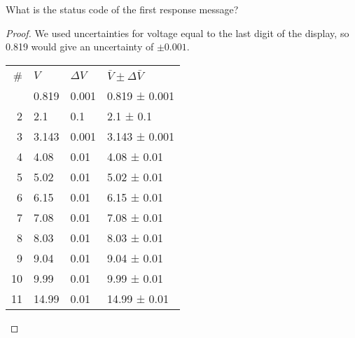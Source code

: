 \documentclass[../../main.tex]{subfiles}
\begin{document}
\begin{wts}
What is the status code of the first response message?
\end{wts}
\begin{proof}

We used uncertainties for voltage equal to the last digit of the display, so 0.819 would give an uncertainty of $\pm 0.001$.
\begin{tabularx}{\textwidth}{@{}r*{3}{l}@{}}
\cmidrule[0.75pt](r){1-4}\addlinespace[0.2em]
\# & $V$ & $\Delta V$ & $\bar V\pm\Delta \bar V$ \tabularnewline \cmidrule[0.5pt](r){1-4}\addlinespace[0.2em] 
1 & 0.819 & 0.001 & 0.819 ± 0.001 \tabularnewline  
2 & 2.1 & 0.1 & 2.1 ± 0.1 \tabularnewline  
3 & 3.143 & 0.001 & 3.143 ± 0.001 \tabularnewline  
4 & 4.08 & 0.01 & 4.08 ± 0.01 \tabularnewline  
5 & 5.02 & 0.01 & 5.02 ± 0.01 \tabularnewline  
6 & 6.15 & 0.01 & 6.15 ± 0.01 \tabularnewline  
7 & 7.08 & 0.01 & 7.08 ± 0.01 \tabularnewline  
8 & 8.03 & 0.01 & 8.03 ± 0.01 \tabularnewline  
9 & 9.04 & 0.01 & 9.04 ± 0.01 \tabularnewline  
10 & 9.99 & 0.01 & 9.99 ± 0.01 \tabularnewline  
11 & 14.99 & 0.01 & 14.99 ± 0.01 \tabularnewline  

\cmidrule[0.75pt](r){1-4}
\end{tabularx}
\end{proof}
\end{document}

